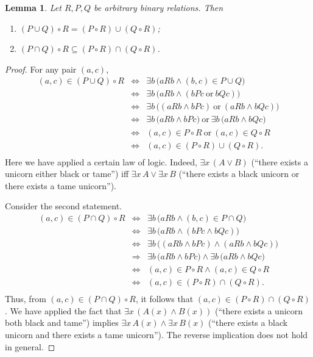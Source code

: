 \documentclass[12pt,notitlepage]{article}
\theoremstyle{plain}
\newtheorem{lemma}[thm]{Lemma}
\theoremstyle{definition}
\theoremstyle{plain}
\newcommand{\sbs}{\subseteq}
\newcommand{\1}{\mathbf{1}}
\newcommand{\0}{\mathbf{0}}
\newcommand{\ply}{\Longrightarrow}
\begin{document}
\begin{lemma}\label{ch0:ex11}
Let $R, P, Q $ be arbitrary binary relations. Then
\begin{enumerate}
\item $(P \cup Q) \circ R = (P \circ R) \cup (Q \circ R)$;
\item $(P \cap Q) \circ R \sbs (P \circ R) \cap (Q \circ R)$.
\end{enumerate}
\end{lemma}
\begin{proof}
For any pair $(a,c)$,
$$
\begin{array}{rcl}
(a, c) \in (P \cup Q) \circ R &\iff& \exists b\, \bigl( a R b \wedge (b,c) \in P \cup Q \bigr)\\
&\iff& \exists b\, \bigl( a R b \wedge ( b P c\ \mbox{or}\ b Q c) \bigr)\\
&\iff& \exists b\, \bigl( (a R b \wedge  b P c)\ \mbox{or}\ (a R b \wedge b Q c) \bigr)\\
&\iff& \exists b\, \bigl( a R b \wedge  b P c \bigl)\ \mbox{or}\ \exists b\, \bigl(a R b \wedge b Q c \bigr)\\
&\iff& (a,c) \in P \circ R\ \mbox{or}\ (a,c) \in Q \circ R\\
&\iff& (a,c) \in (P \circ R) \cup (Q \circ R).\\
\end{array}
$$
Here we have applied a certain law of logic. Indeed, $\exists x\, (A \vee B)$ (``there exists a  unicorn either black or tame'') iff $\exists x\, A \vee \exists x\, B$ (``there exists a black unicorn or there exists a tame unicorn'').

Consider the second statement.
$$
\begin{array}{rcl}
(a, c) \in (P \cap Q) \circ R &\iff& \exists b\, \bigl( a R b \wedge (b,c) \in P \cap Q \bigr)\\
&\iff& \exists b\, \bigl( a R b \wedge ( b P c \wedge b Q c) \bigr)\\
&\iff& \exists b\, \bigl( (a R b \wedge  b P c) \wedge (a R b \wedge b Q c) \bigr)\\
&\ply& \exists b\, \bigl( a R b \wedge  b P c \bigl) \wedge \exists b\, \bigl(a R b \wedge b Q c \bigr)\\
&\iff& (a,c) \in P \circ R \wedge (a,c) \in Q \circ R\\
&\iff& (a,c) \in (P \circ R) \cap (Q \circ R).\\
\end{array}
$$
Thus, from $(a,c) \in (P \cap Q) \circ R$, it follows that $(a,c) \in (P \circ R) \cap (Q \circ R)$. We have applied the fact that $\exists x\, (A(x) \wedge B(x))$ (``there exists a unicorn both black and tame'') implies $\exists x\, A(x) \wedge \exists x\, B(x)$ (``there exists a black unicorn and there exists a tame unicorn''). The reverse implication does not hold in general.
\end{proof}
\end{document}
